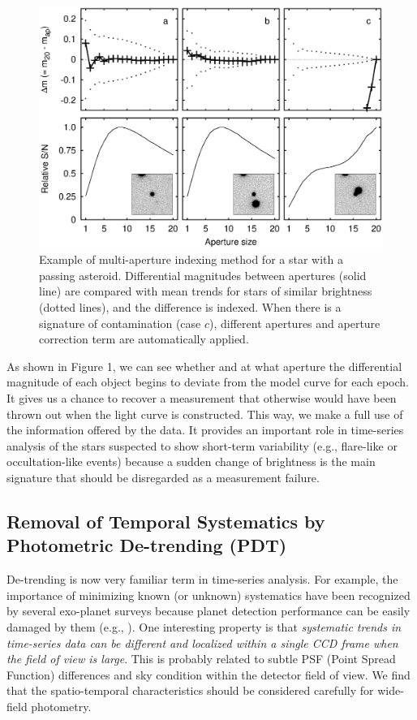 \begin{figure}[!ht]
\begin{center}
\includegraphics[scale=0.45]{part2/Chang_O07/O07_f1.eps}
\caption{Example of multi-aperture indexing method for a star with a passing asteroid.  Differential magnitudes between apertures (solid line) are compared with mean trends for stars of similar brightness (dotted lines), and the difference is indexed.  When there is a signature of contamination (case $c$), different apertures and aperture correction term are automatically applied.}
\end{center}
\label{Fig1}
\end{figure}

\noindent As shown in Figure 1, we can see whether and at what aperture the differential magnitude of each object begins to deviate from the model curve for each epoch.  It gives us a chance to recover a measurement that otherwise would have been thrown out when the light curve is constructed.  This way, we make a full use of the information offered by the data.  It provides an important role in time-series analysis of the stars suspected to show short-term variability (e.g., flare-like or occultation-like events) because a sudden change of brightness is the main signature that should be disregarded as a measurement failure.  

\subsection{Removal of Temporal Systematics by Photometric De-trending (PDT)}
De-trending is now very familiar term in time-series analysis.  For example, the importance of minimizing known (or unknown) systematics have been recognized by several exo-planet surveys because planet detection performance can be easily damaged by them (e.g., \citealt{kov05, tam05, pon06}).  One interesting property is that {\itshape systematic trends in time-series data can be different and localized within a single CCD frame when the field of view is large}.  This is probably related to subtle PSF (Point Spread Function) differences and sky condition within the detector field of view.  We find that the spatio-temporal characteristics should be considered carefully for wide-field photometry.

